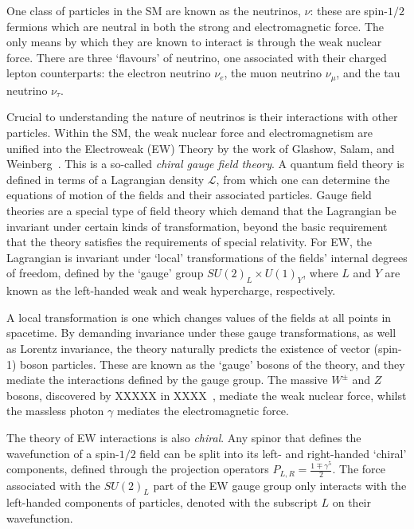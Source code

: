 \begin{figure}
    \centering
    \caption[]{}
    \label{fig:sm_particles}
\end{figure}

One class of particles in the SM are known as the neutrinos, $\nu$: these are spin-$1/2$ fermions which are neutral in both the strong and electromagnetic force. The only means by which they are known to interact is through the weak nuclear force. There are three `flavours' of neutrino, one associated with their charged lepton counterparts: the electron neutrino $\nu_e$, the muon neutrino $\nu_\mu$, and the tau neutrino $\nu_\tau$.

Crucial to understanding the nature of neutrinos is their interactions with other particles. Within the SM, the weak nuclear force and electromagnetism are unified into the Electroweak (EW) Theory by the work of Glashow, Salam, and Weinberg~\cite{}. %
This is a so-called \textit{chiral gauge field theory}. A quantum field theory is defined in terms of a Lagrangian density $\mathcal{L}$, from which one can determine the equations of motion of the fields and their associated particles. Gauge field theories are a special type of field theory which demand that the Lagrangian be invariant under certain kinds of transformation, beyond the basic requirement that the theory satisfies the requirements of special relativity. For EW, the Lagrangian is invariant under `local' transformations of the fields' internal degrees of freedom, defined by the `gauge' group $SU(2)_{L}\times U(1)_{Y}$, where $L$ and $Y$ are known as the left-handed weak and weak hypercharge, respectively.

A local transformation is one which changes values of the fields at all points in spacetime. By demanding invariance under these gauge transformations, as well as Lorentz invariance, the theory naturally predicts the existence of vector (spin-1) boson particles. These are known as the `gauge' bosons of the theory, and they mediate the interactions defined by the gauge group. The massive $W^{\pm}$ and $Z$ bosons, discovered by XXXXX in XXXX~\cite{}, %
mediate the weak nuclear force, whilst the massless photon $\gamma$ mediates the electromagnetic force.

The theory of EW interactions is also \textit{chiral}. Any spinor that defines the wavefunction of a spin-$1/2$ field can be split into its left- and right-handed `chiral' components, defined through the projection operators $P_{L,R} = \frac{1\mp\gamma^{5}}{2}$. The force associated with the $SU(2)_{L}$ part of the EW gauge group only interacts with the left-handed components of particles, denoted with the subscript $L$ on their wavefunction.

